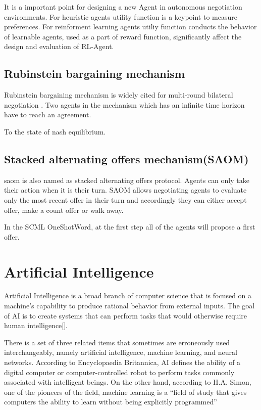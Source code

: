 It is a important point for designing a new Agent in autonomous negotiation environments. For heuristic agents utility function is a keypoint to measure preferences. For reinforment learning agents utiliy function conducts the behavior of learnable agents, used as a part of reward function, significantly affect the design and evaluation of RL-Agent.

\subsection{Rubinstein bargaining mechanism}
Rubinstein bargaining mechanism is widely cited for multi-round bilateral negotiation \parencite{Rubinstein1982}.
Two agents in the mechanism which has an infinite time horizon have to reach an agreement. 

To the state of nash equilibrium.

\subsection{Stacked alternating offers mechanism(SAOM)} \label{background:saom}
\gls{saom} is also named as stacked alternating offers protocol. Agents can only take their action when it is their turn. SAOM allows negotiating agents to evaluate only the most recent offer in their turn and accordingly they can either accept offer, make a count offer or walk away.

In the SCML OneShotWord, at the first step all of the agents will propose a first offer.

\section{Artificial Intelligence}
Artificial Intelligence is a broad branch of computer science that is focused on a machine’s capability to produce rational behavior from external inputs. The goal of AI is to create systems that can perform tasks that would otherwise require human intelligence[].

There is a set of three related items that sometimes are erroneously used interchangeably, namely artificial intelligence, machine learning, and neural networks. According to Encyclopaedia Britannica, AI defines the ability of a digital computer or computer-controlled robot to perform tasks commonly associated with intelligent beings. On the other hand, according to H.A. Simon, one of the pioneers of the field, machine learning is a “field of study that gives computers the ability to learn without being explicitly programmed”

